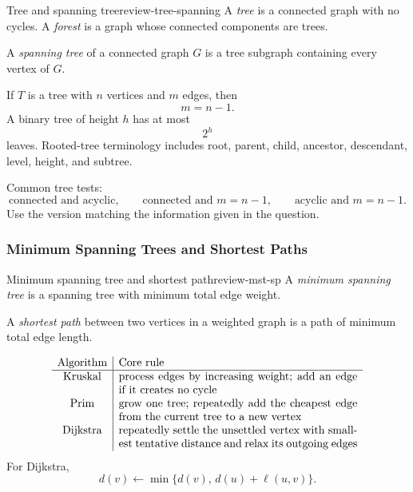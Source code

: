 \begin{definition}{Tree and spanning tree}{review-tree-spanning}
A \emph{tree} is a connected graph with no cycles. A \emph{forest} is a graph whose connected components are trees.

A \emph{spanning tree} of a connected graph \(G\) is a tree subgraph containing every vertex of \(G\).
\end{definition}

\begin{keyformula}[title={Tree formulas and rooted-tree terminology}]
If \(T\) is a tree with \(n\) vertices and \(m\) edges, then
\[
m=n-1.
\]
A binary tree of height \(h\) has at most
\[
2^h
\]
leaves.
Rooted-tree terminology includes root, parent, child, ancestor, descendant, level, height, and subtree.
\end{keyformula}

\begin{examtip}[title={Tree recognition}]
Common tree tests:
\[
\text{connected and acyclic},
\qquad
\text{connected and }m=n-1,
\qquad
\text{acyclic and }m=n-1.
\]
Use the version matching the information given in the question.
\end{examtip}

\subsubsection{Minimum Spanning Trees and Shortest Paths}

\begin{definition}{Minimum spanning tree and shortest path}{review-mst-sp}
A \emph{minimum spanning tree} is a spanning tree with minimum total edge weight.

A \emph{shortest path} between two vertices in a weighted graph is a path of minimum total edge length.
\end{definition}

\begin{keyformula}[title={Kruskal, Prim, and Dijkstra}]
\[
\begin{array}{c|p{0.62\textwidth}}
\text{Algorithm} & \text{Core rule} \\ \hline
\text{Kruskal} & process edges by increasing weight; add an edge if it creates no cycle \\
\text{Prim} & grow one tree; repeatedly add the cheapest edge from the current tree to a new vertex \\
\text{Dijkstra} & repeatedly settle the unsettled vertex with smallest tentative distance and relax its outgoing edges
\end{array}
\]
For Dijkstra,
\[
d(v)\leftarrow \min\{d(v),\,d(u)+\ell(u,v)\}.
\]
\end{keyformula}

